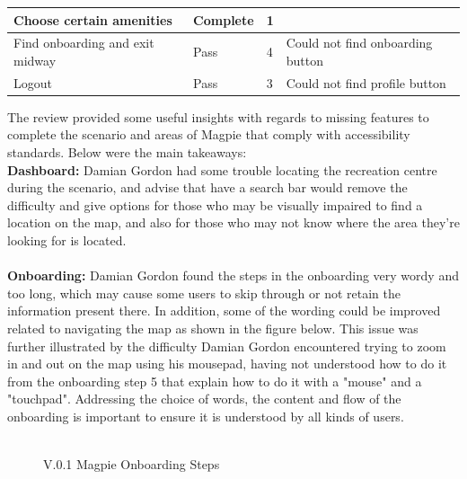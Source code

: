 \begin{table}[h!]
\begin{tabular}{|p{}|p{}|p{}|p{}|}
        \hline
        Choose certain amenities         & Complete        & 1                   &                                                                                   \\
        \hline
        Find onboarding and exit midway  & Pass            & 4                   & Could not find onboarding button                                                  \\
        \hline
        Logout                           & Pass            & 3                   & Could not find profile button                                                     \\
        \hline
    \end{tabular}
\end{table}

\newpage
\noindent The review provided some useful insights with regards to missing features to complete the scenario and areas of Magpie that comply with accessibility standards. Below were the main takeaways:\\
\textbf{Dashboard: }
Damian Gordon had some trouble locating the recreation centre during the scenario, and advise that have a search bar would remove the difficulty and give options for those who may be visually impaired to find a location on the map, and also for those who may not know where the area they're looking for is located.\\\\
\textbf{Onboarding: }
Damian Gordon found the steps in the onboarding very wordy and too long, which may cause some users to skip through or not retain the information present there. In addition, some of the wording could be improved related to navigating the map as shown in the figure below. This issue was further illustrated by the difficulty Damian Gordon encountered trying to zoom in and out on the map using his mousepad, having not understood how to do it from the onboarding step 5 that explain how to do it with a "mouse" and a "touchpad". Addressing the choice of words, the content and flow of the onboarding is important to ensure it is understood by all kinds of users.\\\\
\begin{figure}
    \centering
    \caption{V.0.1 Magpie Onboarding Steps}
\end{figure}
